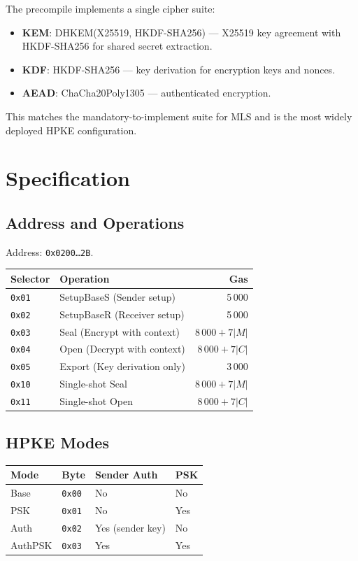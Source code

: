\documentclass[11pt,a4paper]{article}
\begin{document}
The precompile implements a single cipher suite:
\begin{itemize}
  \item \textbf{KEM}: DHKEM(X25519, HKDF-SHA256) --- X25519 key agreement
    with HKDF-SHA256 for shared secret extraction.
  \item \textbf{KDF}: HKDF-SHA256 --- key derivation for encryption keys and nonces.
  \item \textbf{AEAD}: ChaCha20Poly1305 --- authenticated encryption.
\end{itemize}

This matches the mandatory-to-implement suite for MLS and is the most
widely deployed HPKE configuration.

\section{Specification}

\subsection{Address and Operations}

Address: \texttt{0x0200\ldots2B}.

\begin{table}[H]
\centering
\begin{tabular}{llr}
\toprule
\textbf{Selector} & \textbf{Operation} & \textbf{Gas} \\
\midrule
\texttt{0x01} & SetupBaseS (Sender setup) & 5\,000 \\
\texttt{0x02} & SetupBaseR (Receiver setup) & 5\,000 \\
\texttt{0x03} & Seal (Encrypt with context) & $8\,000 + 7|M|$ \\
\texttt{0x04} & Open (Decrypt with context) & $8\,000 + 7|C|$ \\
\texttt{0x05} & Export (Key derivation only) & 3\,000 \\
\texttt{0x10} & Single-shot Seal & $8\,000 + 7|M|$ \\
\texttt{0x11} & Single-shot Open & $8\,000 + 7|C|$ \\
\bottomrule
\end{tabular}
\end{table}

\subsection{HPKE Modes}

\begin{table}[H]
\centering
\begin{tabular}{llll}
\toprule
\textbf{Mode} & \textbf{Byte} & \textbf{Sender Auth} & \textbf{PSK} \\
\midrule
Base & \texttt{0x00} & No & No \\
PSK & \texttt{0x01} & No & Yes \\
Auth & \texttt{0x02} & Yes (sender key) & No \\
AuthPSK & \texttt{0x03} & Yes & Yes \\
\bottomrule
\end{tabular}
\end{table}
\end{document}
